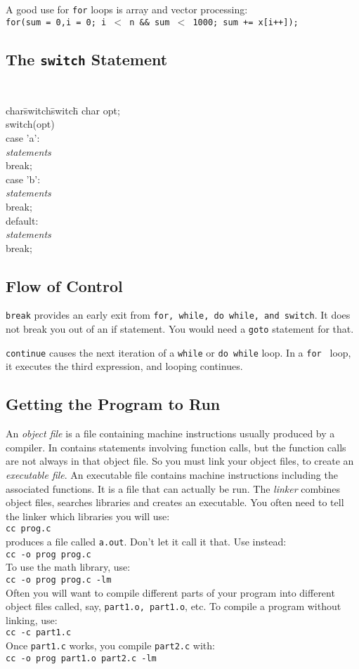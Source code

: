 \documentclass{article}
\begin{document}
A good use for {\tt for} loops is array and vector processing:\\
{\tt for(sum = 0,i = 0; i $<$ n \&\& sum $<$ 1000; sum += x[i++]);}\\

\subsection{The {\tt switch} Statement}
\label{sec:switch}
{\tt
\begin{tabbing}
char\=switch\=switch\= \kill
char opt;\>\>\>\\
\>switch(opt)\>\>\\
\>\>case 'a':\>\\
\>\>\>\emph{statements}\\
\>\>\>break;\\
\>\>case 'b':\>\\
\>\>\>\emph{statements}\\
\>\>\>break;\\
\>\>default:\>\\
\>\>\>\emph{statements}\\
\>\>\>break;
\end{tabbing}
}
\subsection{Flow of Control}
\label{sec:flow}

{\tt break} provides an early exit from {\tt for, while, do while, and
switch}.  It does not break you out of an if statement.  You would need
a {\tt goto} statement for that.

{\tt continue} causes the next iteration of a {\tt while} or {\tt do while}
loop.  In a {\tt for } loop, it executes the third expression, and 
looping continues.

\subsection{Getting the Program to Run}
\label{sec:running}

An \emph{object file} is a file containing machine instructions usually
produced by a compiler.  In contains statements involving function calls,
but the function calls are not always in that object file.  So you must
link your object files, to create an \emph{executable file}.
An executable file contains machine instructions including the associated
functions.  It is a file that can actually be run.  The \emph{linker}
combines object files, searches libraries and creates an executable.
You often need to tell the linker which libraries you will use:\\
{\tt cc prog.c}\\
produces a file called {\tt a.out}.  Don't let it call it that.  Use instead:\\
{\tt cc -o prog prog.c}\\
To use the math library, use:\\
{\tt cc -o prog prog.c -lm}\\

Often you will want to compile different parts of your program into 
different object files called, say, {\tt part1.o, part1.o}, etc.
To compile a program without linking, use:\\
{\tt cc -c part1.c}\\
Once {\tt part1.c} works, you compile {\tt part2.c} with:\\
{\tt cc -o prog part1.o part2.c -lm}\\
\end{document}
